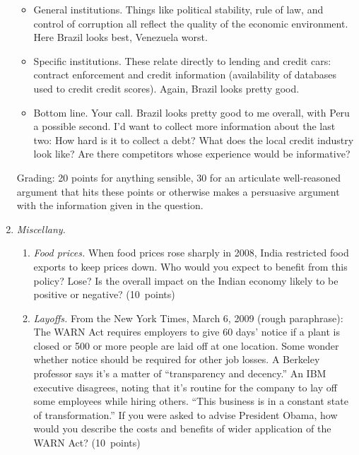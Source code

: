 \documentclass[letterpaper,12pt]{article}
\begin{document}
\begin{enumerate}
\begin{itemize}
\item General institutions. 
Things like political stability, rule of law, 
and control of corruption all reflect the quality of the 
economic environment.  
Here Brazil looks best, Venezuela worst.  

\item Specific institutions.  
These relate directly to lending and credit cars:  
contract enforcement and credit information 
(availability of databases used to credit credit scores).  
Again, Brazil looks pretty good.  

\item Bottom line.  Your call.
Brazil looks pretty good to me overall, 
with Peru a possible second.  
I'd want to collect more information about the last two:
How hard is it to collect a debt?  
What does the local credit industry look like?  
Are there competitors whose experience would be informative?  

\end{itemize}

Grading:  20 points for anything sensible, 
30 for an articulate well-reasoned argument that hits these points
or otherwise makes a persuasive argument with the information
given in the question. 



\item {\it Miscellany.\/}
\begin{enumerate}

\item {\it Food prices.\/}
When food prices rose sharply in 2008, India restricted
food exports to keep prices down. 
Who would you expect to benefit from this policy?  Lose?  
Is the overall impact on the Indian economy likely to be 
positive or negative?   
(10~points)

\item {\it Layoffs.\/}
From the New York Times, March 6, 2009 (rough paraphrase):   
The WARN Act requires employers to give 60 days' notice 
if a plant is closed or 500 or more people are laid off at one location.  
Some wonder whether notice should be required for other job losses.
A Berkeley professor says  
it's a matter of ``transparency and decency.'' 
An IBM executive disagrees, noting that it's routine for the company to lay off some employees while hiring others.  
``This business is in a constant state of transformation.''  
If you were asked to advise President Obama, 
how would you describe the costs and benefits of 
wider application of the WARN Act?  
(10~points) 


\end{enumerate}
\end{enumerate}
\end{document}
